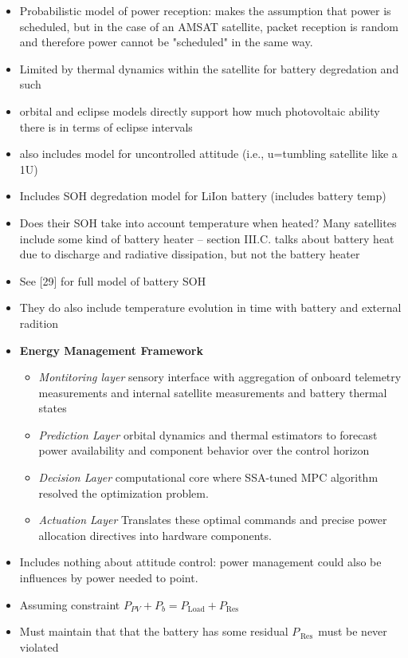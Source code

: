 \documentclass[11pt]{article}
\begin{document}
\begin{itemize}[noitemsep]
    \item Probabilistic model of power reception: makes the assumption that power is scheduled, but in the case of an AMSAT satellite, packet reception is random and therefore power cannot be "scheduled" in the same way. 
    \item Limited by thermal dynamics within the satellite for battery degredation and such
    \item orbital and eclipse models directly support how much photovoltaic ability there is in terms of eclipse intervals
    \item also includes model for uncontrolled attitude (i.e., u=tumbling satellite like a 1U)
    \item Includes SOH degredation model for LiIon battery (includes battery temp)
    \item Does their SOH take into account temperature when heated? Many satellites include some kind of battery heater -- section III.C. talks about battery heat due to discharge and radiative dissipation, but not the battery heater
    \item See [29] for full model of battery SOH
    \item They do also include temperature evolution in time with battery and external radition 
    \item \textbf{Energy Management Framework}
    \begin{itemize}[noitemsep]
        \item \textit{Montitoring layer} sensory interface with aggregation of onboard telemetry measurements and internal satellite measurements and battery thermal states
        \item \textit{Prediction Layer} orbital dynamics and thermal estimators to forecast power availability and component behavior over the control horizon
        \item \textit{Decision Layer} computational core where SSA-tuned MPC algorithm resolved the optimization problem.
        \item \textit{Actuation Layer} Translates these optimal commands and precise power allocation directives into hardware components.
    \end{itemize}
    \item Includes nothing about attitude control: power management could also be influences by power needed to point.
    \item Assuming constraint $P_{PV} + P_b = P_{\text{Load}} + P_{\text{Res}}$ 
    \item Must maintain that that the battery has some residual $P_{\,\text{Res}\,}$ must be never violated

\end{itemize}
\end{document}
